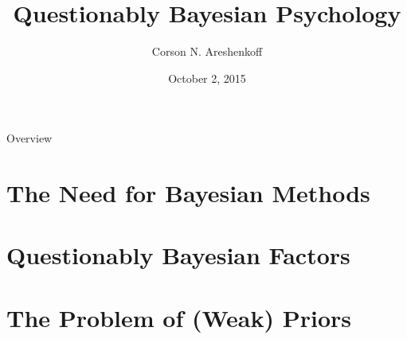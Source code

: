 \documentclass{beamer}
\title{Questionably Bayesian Psychology}
\date{October 2, 2015}
\author{Corson N. Areshenkoff}
\institute{University of Victoria}
\begin{document}
\maketitle
\AtBeginSection{\frame{\sectionpage}}

\begin{frame}{Overview}
\tableofcontents
\end{frame}

\section{The Need for Bayesian Methods}


\section{Questionably Bayesian Factors}


\section{The Problem of (Weak) Priors}
\end{document}
